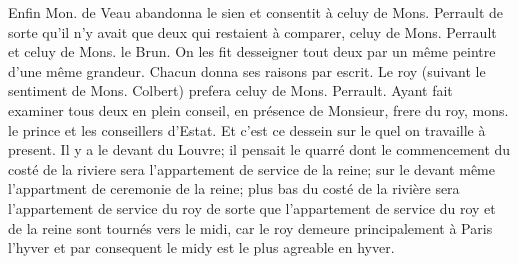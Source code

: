 Enfin Mon. de Veau\protect{} abandonna le sien et consentit à celuy de Mons. Perrault\protect{} de sorte qu'il n'y avait que deux qui restaient à comparer, celuy de Mons. Perrault\protect{} et celuy de Mons. le Brun\protect{}. On les fit desseigner tout deux par un m\^{e}me peintre d'une même grandeur. Chacun donna ses raisons par escrit. Le roy\protect{} (suivant le sentiment de Mons. Colbert\protect{}) prefera celuy de Mons. Perrault\protect{}. Ayant fait examiner tous deux en plein conseil, en pr\'{e}sence de Monsieur, frere du roy\protect{}, mons. le prince et les conseillers d'Estat. Et c'est ce dessein sur le quel on travaille à present. Il y a le devant du Louvre\protect{}; il pensait le quarr\'{e} dont le commencement du cost\'{e} de la riviere\protect{} sera l'appartement de service de la reine; sur le devant même l'appartment de ceremonie de la reine; plus bas du cost\'{e} de la rivi\`{e}re\protect{} sera l'appartement de service du roy\protect{} de sorte que l'appartement de service du roy\protect{} et de la reine sont tourn\'{e}s vers le midi\protect{}, car le roy\protect{} demeure principalement à Paris l'hyver\protect{} et par consequent le midy\protect{} est le plus agreable en hyver\protect{}.%
\pend%
\count{}
\count{}
\count{}
\newpage
\pstart%
\noindent%
\centering%
